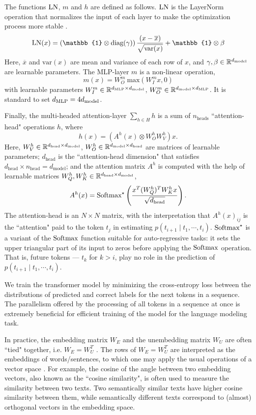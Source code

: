 The functions $\text{LN}$, $m$ and $h$ are defined as follows. $\text{LN}$ is the LayerNorm operation that normalizes the input of each layer to make the optimization process more stable \cite{ba2016layer}.
\[
\LN(x) = \left(\mathbb{1} \otimes \text{diag}(\gamma) \right) \frac{(x-\overline{x})}{\sqrt{\text{var}(x)}} + \mathbb{1} \otimes \beta
\]
Here, $\overline{x}$ and $\text{var}(x)$ are mean and variance of each row of $x$, and $\gamma, \beta \in \mathbb{R}^{d_{\text{model}}}$ are learnable parameters. The MLP-layer $m$ is a non-linear operation, 
\[
m(x) =W^m_O \ \text{max}(W_I^m x, 0)
\]
with learnable parameters $W^m_I \in \mathbb{R}^{d_{\text{MLP}} \times d_{\text{model}}}$, $W^m_O \in \mathbb{R}^{d_{\text{model}} \times d_{\text{MLP}}}$. It is standard to set $d_{\text{MLP}} = 4 d_{\text{model}}$.
\newline 

Finally, the multi-headed attention-layer $\sum_{h \in H} h$ is a sum of $n_{\text{heads}}$ ``attention-head" operations $h$, where
\[
h(x) = (A^h(x) \otimes W^h_O W^h_V) x.
\]
Here, $W^h_V \in \mathbb{R}^{d_{\text{head}} \times d_{\text{model}}}$, 
$W^h_O \in \mathbb{R}^{d_{\text{model}} \times d_{\text{head}}}$ 
are matrices of learnable parameters; 
$d_{\text{head}}$ is the ``attention-head dimension" that satisfies $d_{\text{head}} \times n_{\text{head}} = d_{\text{model}}$; and the attention matrix $A^h$ is computed with the help of learnable matrices 
$W^h_Q, W^h_K \in \mathbb{R}^{d_{\text{head}} \times d_{\text{model}}}$,
\[
A^h(x) = \text{Softmax}^\star \left(\frac{x^T (W^h_Q)^T W^h_K x}{\sqrt{d_{\text{head}}}}\right).
\] 
The attention-head is an $N \times N$ matrix, with the interpretation that $A^h(x)_{ij}$ 
is the ``attention" paid to the token 
$t_j$ in estimating 
$p(t_{i+1} \mid t_1, \cdots, t_i)$. $\text{Softmax}^\star$
is a variant of the $\text{Softmax}$ function suitable for auto-regressive tasks: it sets the upper triangular part of its input to zeros before applying the 
$\text{Softmax}$ operation. 
That is, future tokens --- $t_k$ for $k > i$, play no role in the prediction of $p(t_{i+1} \mid t_1, \cdots, t_i)$.
\newline 

We train the transformer model by minimizing the cross-entropy loss between the distributions of predicted and correct labels for the next tokens in a sequence. The parallelism offered by the processing of all tokens in a sequence at once is extremely beneficial for efficient training of the model for the language modeling task.
\newline 

In practice, the embedding matrix $W_E$ and the unembedding matrix $W_U$ are often ``tied" together, i.e. $W_E = W_U^T$ \cite{press2017using, inan2017tying}.
The rows of $W_E = W_U^T$ are interpreted as the embeddings of words/sentences, to which one may apply the usual operations of a vector space \cite{Bengio:2003, mikolov-etal-2013-linguistic}. 
For example, the cosine of the angle between two embedding vectors, also known as the ``cosine similarity", is often used to measure the similarity between two texts. 
Two semantically similar texts have higher cosine similarity between them, while semantically different texts correspond to (almost) orthogonal vectors in the embedding space.



